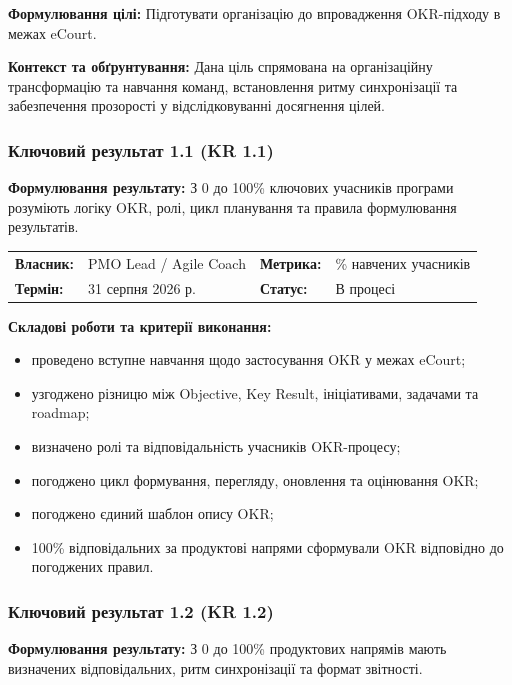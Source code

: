 \documentclass{article}
\begin{document}
\textbf{Формулювання цілі:} Підготувати організацію до впровадження OKR-підходу в межах eCourt.

\textbf{Контекст та обґрунтування:}
Дана ціль спрямована на організаційну трансформацію та навчання команд, встановлення ритму синхронізації та забезпечення прозорості у відслідковуванні досягнення цілей.

\subsubsection{Ключовий результат 1.1 (KR 1.1)}

\textbf{Формулювання результату:} З 0 до 100\% ключових учасників програми розуміють логіку OKR, ролі, цикл планування та правила формулювання результатів.

\noindent\begin{tabular}{@{}p{2.2cm}p{4.5cm}p{2.2cm}p{4.5cm}@{}}
\toprule
\textbf{Власник:} & PMO Lead / Agile Coach & \textbf{Метрика:} & \% навчених учасників \\
\textbf{Термін:} & 31 серпня 2026 р. & \textbf{Статус:} & В процесі \\
\bottomrule
\end{tabular}

\vspace{10pt}
\textbf{Складові роботи та критерії виконання:}
\begin{itemize}
    \item проведено вступне навчання щодо застосування OKR у межах eCourt;
    \item узгоджено різницю між Objective, Key Result, ініціативами, задачами та roadmap;
    \item визначено ролі та відповідальність учасників OKR-процесу;
    \item погоджено цикл формування, перегляду, оновлення та оцінювання OKR;
    \item погоджено єдиний шаблон опису OKR;
    \item 100\% відповідальних за продуктові напрями сформували OKR відповідно до погоджених правил.
\end{itemize}

\subsubsection{Ключовий результат 1.2 (KR 1.2)}

\textbf{Формулювання результату:} З 0 до 100\% продуктових напрямів мають визначених відповідальних, ритм синхронізації та формат звітності.
\end{document}

